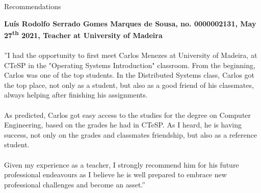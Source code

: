 \documentclass{resume} %
\begin{document}
\begin{rSection}{Recommendations}

\begin{paragraph}{}
\textbf{Luís Rodolfo Serrado Gomes Marques de Sousa, no. 0000002131, May 27\textsuperscript{th} 2021, Teacher at University of Madeira}
\\
\\
''I had the opportunity to first meet Carlos Menezes at University of Madeira, at CTeSP in the "Operating Systems Introduction" classroom. From the beginning, Carlos was one of the top students. In the Distributed Systems class, Carlos got the top place, not only as a student, but also as a good friend of his classmates, always helping after finishing his assignments.
\\
\\
As predicted, Carlos got easy access to the studies for the degree on Computer Engineering, based on the grades he had in CTeSP. As I heard, he is having success, not only on the grades and classmates friendship, but also as a reference student.
\\
\\
Given my experience as a teacher, I strongly recommend him for his future professional endeavours as I believe he is well prepared to embrace new professional challenges and become an asset.''
\end{paragraph}

\end{rSection}
\end{document}
